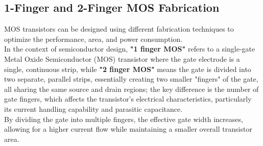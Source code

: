 \documentclass[a4paper,12pt]{article}
\begin{document}
	\subsection{1-Finger and 2-Finger MOS Fabrication}
	MOS transistors can be designed using different fabrication techniques to optimize the performance, area, and power consumption. \\
	In the context of semiconductor design, \textbf{"1 finger MOS"} refers to a single-gate Metal Oxide Semiconductor (MOS) transistor where the gate electrode is a single, continuous strip, while \textbf{"2 finger MOS"} means the gate is divided into two separate, parallel strips, essentially creating two smaller "fingers" of the gate, all sharing the same source and drain regions; the key difference is the number of gate fingers, which affects the transistor's electrical characteristics, particularly its current handling capability and parasitic capacitance.\\
	By dividing the gate into multiple fingers, the effective gate width increases, allowing for a higher current flow while maintaining a smaller overall transistor area.\\
\end{document}
